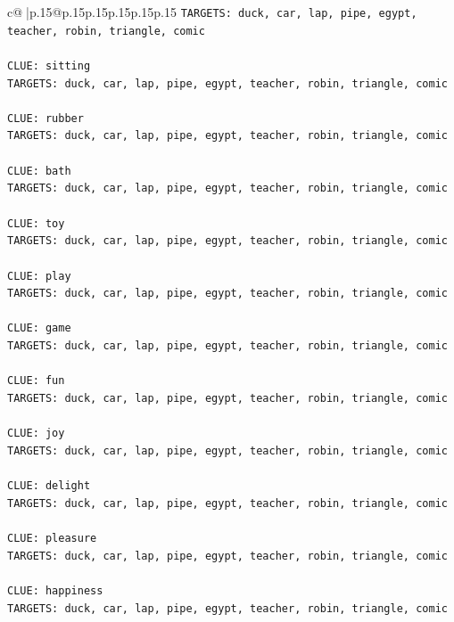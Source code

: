 \documentclass{article}
\begin{document}
{\begin{supertabular}{c@{$\;$}|p{.15\linewidth}@{}p{.15\linewidth}p{.15\linewidth}p{.15\linewidth}p{.15\linewidth}p{.15\linewidth}}
{{{\texttt{TARGETS: duck, car, lap, pipe, egypt, teacher, robin, triangle, comic} \\
\\ 
\texttt{CLUE: sitting} \\
\texttt{TARGETS: duck, car, lap, pipe, egypt, teacher, robin, triangle, comic} \\
\\ 
\texttt{CLUE: rubber} \\
\texttt{TARGETS: duck, car, lap, pipe, egypt, teacher, robin, triangle, comic} \\
\\ 
\texttt{CLUE: bath} \\
\texttt{TARGETS: duck, car, lap, pipe, egypt, teacher, robin, triangle, comic} \\
\\ 
\texttt{CLUE: toy} \\
\texttt{TARGETS: duck, car, lap, pipe, egypt, teacher, robin, triangle, comic} \\
\\ 
\texttt{CLUE: play} \\
\texttt{TARGETS: duck, car, lap, pipe, egypt, teacher, robin, triangle, comic} \\
\\ 
\texttt{CLUE: game} \\
\texttt{TARGETS: duck, car, lap, pipe, egypt, teacher, robin, triangle, comic} \\
\\ 
\texttt{CLUE: fun} \\
\texttt{TARGETS: duck, car, lap, pipe, egypt, teacher, robin, triangle, comic} \\
\\ 
\texttt{CLUE: joy} \\
\texttt{TARGETS: duck, car, lap, pipe, egypt, teacher, robin, triangle, comic} \\
\\ 
\texttt{CLUE: delight} \\
\texttt{TARGETS: duck, car, lap, pipe, egypt, teacher, robin, triangle, comic} \\
\\ 
\texttt{CLUE: pleasure} \\
\texttt{TARGETS: duck, car, lap, pipe, egypt, teacher, robin, triangle, comic} \\
\\ 
\texttt{CLUE: happiness} \\
\texttt{TARGETS: duck, car, lap, pipe, egypt, teacher, robin, triangle, comic} \\
}}}
\end{supertabular}}
\end{document}
